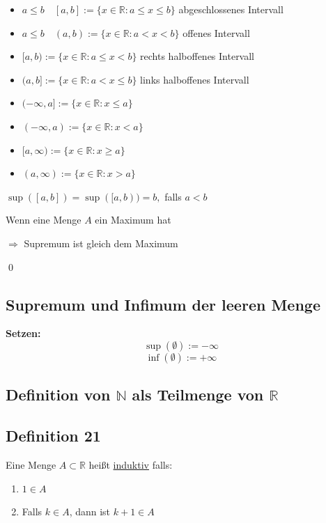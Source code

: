 \documentclass[fleqn]{scrbook}
\renewenvironment{proof}{{\bfseries Beweis }}{\qed}
\begin{document}
\begin{itemize}
  \item $a \leq b \quad [a,b] := \{x \in \mathbb{R}:a \leq x \leq b\}$ abgeschlossenes Intervall
  \item $a \leq b \quad (a,b) := \{x \in \mathbb{R}:a < x < b\}$ offenes Intervall
  \item $[a,b) := \{x \in \mathbb{R}:a \leq x < b\}$ rechts halboffenes Intervall
  \item $(a,b]:= \{x \in \mathbb{R}:a < x \leq b\}$ links halboffenes Intervall
  \item $(-\infty,a]:= \{x \in \mathbb{R}:x \leq a\}$
  \item $(-\infty,a):= \{x \in \mathbb{R}:x < a\}$
  \item $[a,\infty):= \{x \in \mathbb{R}:x \geq a\}$
  \item $(a,\infty):= \{x \in \mathbb{R}:x > a\}$
\end{itemize}

\begin{proof}
$\sup([a,b])=\sup([a,b)) = b,$ falls $a<b \quad $

Wenn eine Menge $A$ ein Maximum hat 

$\Longrightarrow$ Supremum ist gleich dem Maximum

\end{proof}

\subsection{Supremum und Infimum der leeren Menge}
\textbf{Setzen:}
\[\sup(\emptyset):=-\infty\]
\[\inf(\emptyset):=+\infty\]

\subsection{Definition von \texorpdfstring{$\mathbb{N}$}{N} als Teilmenge von \texorpdfstring{$\mathbb{R}$}{R}}

\subsection{Definition 21}

Eine Menge $A \subset \mathbb{R}$ heißt \underline{induktiv} falls:

\begin{enumerate}
  \item $1 \in A$
  \item Falls $k \in A$, dann ist $k+1 \in A$
\end{enumerate}
\end{document}

